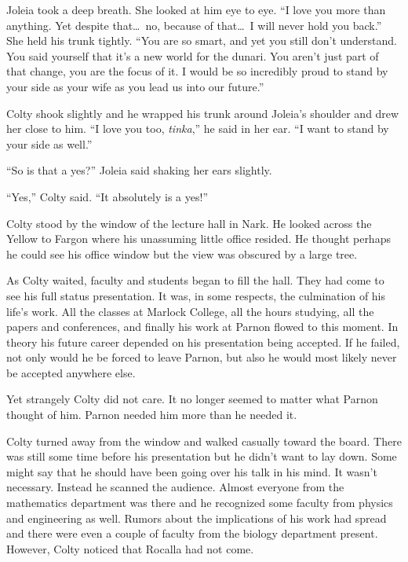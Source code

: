 Joleia took a deep breath. She looked at him eye to eye. ``I love you more than anything. Yet
despite that\ldots\ no, because of that\ldots\ I will never hold you back.'' She held his trunk
tightly. ``You are so smart, and yet you still don't understand. You said yourself that it's a
new world for the dunari. You aren't just part of that change, you are the focus of it. I would
be so incredibly proud to stand by your side as your wife as you lead us into our future.''

Colty shook slightly and he wrapped his trunk around Joleia's shoulder and drew her close to
him. ``I love you too, \textit{tinka},'' he said in her ear. ``I want to stand by your side as
well.''

``So is that a yes?'' Joleia said shaking her ears slightly.

``Yes,'' Colty said. ``It absolutely is a yes!''

\spacebreak

Colty stood by the window of the lecture hall in Nark. He looked across the Yellow to Fargon
where his unassuming little office resided. He thought perhaps he could see his office window
but the view was obscured by a large tree.

As Colty waited, faculty and students began to fill the hall. They had come to see his full
status presentation. It was, in some respects, the culmination of his life's work. All the
classes at Marlock College, all the hours studying, all the papers and conferences, and finally
his work at Parnon flowed to this moment. In theory his future career depended on his
presentation being accepted. If he failed, not only would he be forced to leave Parnon, but also
he would most likely never be accepted anywhere else.

Yet strangely Colty did not care. It no longer seemed to matter what Parnon thought of him.
Parnon needed him more than he needed it.

Colty turned away from the window and walked casually toward the board. There was still some
time before his presentation but he didn't want to lay down. Some might say that he should have
been going over his talk in his mind. It wasn't necessary. Instead he scanned the audience.
Almost everyone from the mathematics department was there and he recognized some faculty from
physics and engineering as well. Rumors about the implications of his work had spread and there
were even a couple of faculty from the biology department present. However, Colty noticed that
Rocalla had not come.

